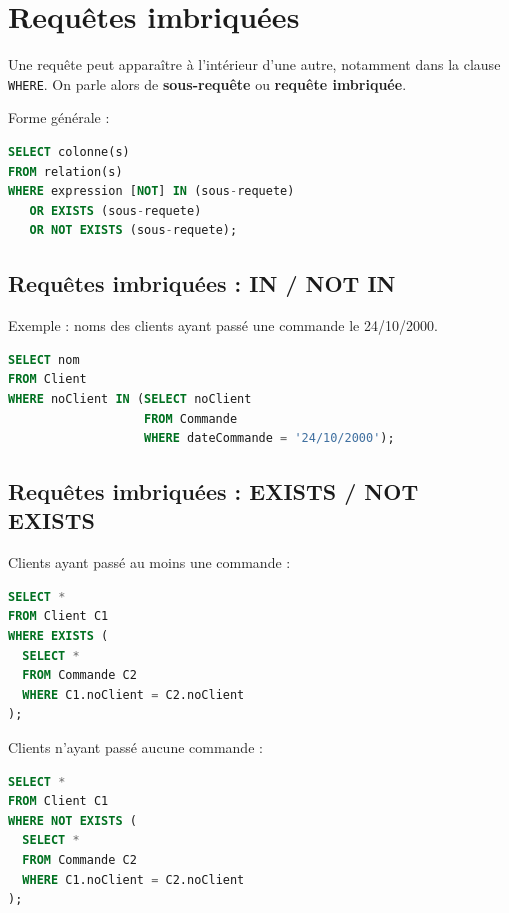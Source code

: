 \section{Requêtes imbriquées}

Une requête peut apparaître à l’intérieur d’une autre, notamment dans la clause \texttt{WHERE}.  
On parle alors de \textbf{sous-requête} ou \textbf{requête imbriquée}.

Forme générale :

\begin{sqlcodebox}
\begin{lstlisting}[language=SQL]
SELECT colonne(s)
FROM relation(s)
WHERE expression [NOT] IN (sous-requete)
   OR EXISTS (sous-requete)
   OR NOT EXISTS (sous-requete);
\end{lstlisting}
\end{sqlcodebox}


\subsection{Requêtes imbriquées : IN / NOT IN}

Exemple : noms des clients ayant passé une commande le 24/10/2000.

\begin{sqlcodebox}
\begin{lstlisting}[language=SQL]
SELECT nom
FROM Client
WHERE noClient IN (SELECT noClient
                   FROM Commande
                   WHERE dateCommande = '24/10/2000');
\end{lstlisting}
\end{sqlcodebox}


\subsection{Requêtes imbriquées : EXISTS / NOT EXISTS}

Clients ayant passé au moins une commande :

\begin{sqlcodebox}
\begin{lstlisting}[language=SQL]
SELECT *
FROM Client C1
WHERE EXISTS (
  SELECT *
  FROM Commande C2
  WHERE C1.noClient = C2.noClient
);
\end{lstlisting}
\end{sqlcodebox}

Clients n’ayant passé aucune commande :

\begin{sqlcodebox}
\begin{lstlisting}[language=SQL]
SELECT *
FROM Client C1
WHERE NOT EXISTS (
  SELECT *
  FROM Commande C2
  WHERE C1.noClient = C2.noClient
);
\end{lstlisting}
\end{sqlcodebox}

